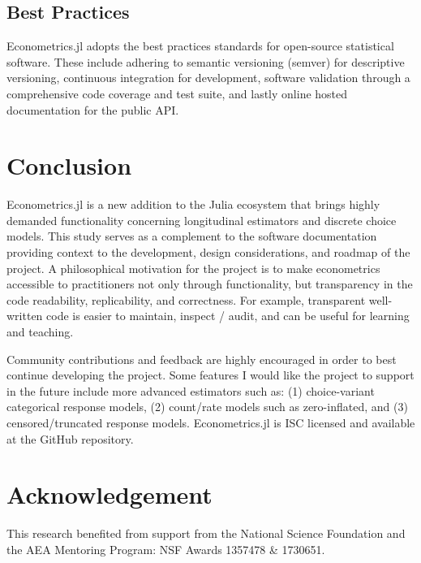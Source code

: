 \documentclass{juliacon}
\begin{document}
\subsection{Best Practices}

Econometrics.jl adopts the best practices standards for open-source statistical software. These include adhering to semantic versioning (semver) for descriptive versioning, continuous integration for development, software validation through a comprehensive code coverage and test suite, and lastly online hosted documentation for the public API.

\section{Conclusion}

Econometrics.jl is a new addition to the Julia ecosystem that brings highly demanded functionality concerning longitudinal estimators and discrete choice models. This study serves as a complement to the software documentation providing context to the development, design considerations, and roadmap of the project. A philosophical motivation for the project is to make econometrics accessible to practitioners not only through functionality, but transparency in the code readability, replicability, and correctness. For example, transparent well-written code is easier to maintain, inspect / audit, and can be useful for learning and teaching.

Community contributions and feedback are highly encouraged in order to best continue developing the project. Some features I would like the project to support in the future include more advanced estimators such as: (1) choice-variant categorical response models, (2) count/rate models such as zero-inflated, and (3) censored/truncated response models. Econometrics.jl is ISC licensed and available at the GitHub repository.

\section{Acknowledgement}

This research benefited from support from the National Science Foundation and the AEA Mentoring Program: NSF Awards 1357478 \& 1730651.



\appendix
\onecolumn





\end{document}
